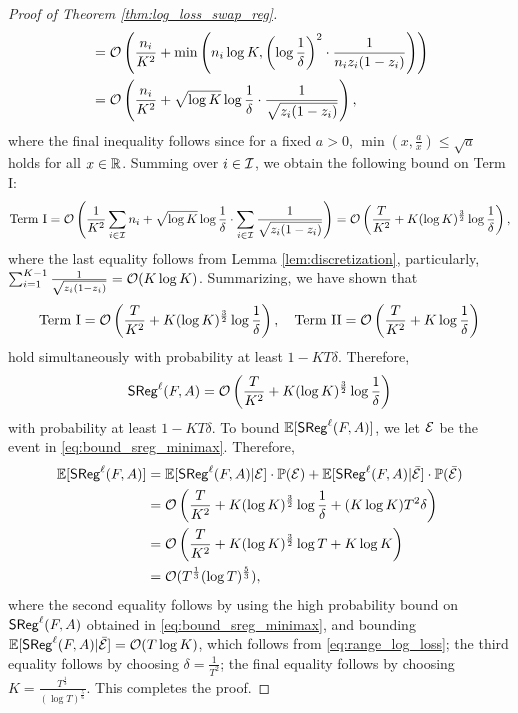 \begin{proof}[Proof of Theorem \ref{thm:log_loss_swap_reg}]
\begin{align*}
        &= \mathcal{O}\left( \frac{n_{i}}{K ^ {2}} + \min\left( n_{i} \log K, \left( \log \frac{1}{\delta} \right) ^ {2} \cdot \frac{1}{n_{i} z_{i}(1 - z_{i})} \right) \right) \\
        &= \mathcal{O}\left( \frac{n_{i}}{K ^ {2}} + \sqrt{\log K}\log \frac{1}{\delta} \cdot \frac{1}{\sqrt{z_{i} (1 - z_{i})}} \right),
    \end{align*}
    where the final inequality follows since for a fixed $a > 0$, $\min(x, \frac{a}{x}) \le \sqrt{a}$ holds for all $x \in {\mathbb{R}}$. Summing over $i \in \mathcal{I}$, we obtain the following bound on Term I: \begin{align*}
        \text{Term I} = \mathcal{O}\left( \frac{1}{K ^ {2}} \sum_{i \in \mathcal{I}} n_{i} + \sqrt{\log K}\log \frac{1}{\delta} \cdot \sum_{i \in \mathcal{I}} \frac{1}{\sqrt{z_{i} (1 - z_{i})}} \right) = \mathcal{O}\left( \frac{T}{K ^ {2}} + K (\log K)^{\frac{3}{2}}  \log \frac{1}{\delta} \right),
    \end{align*}
    where the last equality follows from Lemma \ref{lem:discretization}, particularly, $\sum_{i = 1} ^ {K - 1} \frac{1}{\sqrt{z_{i}(1 - z_{i})}} = \mathcal{O}(K \log K)$. Summarizing, we have shown that \begin{align*}
        \text{Term I} = \mathcal{O}\left( \frac{T}{K ^ {2}} + K (\log K)^{\frac{3}{2}}  \log \frac{1}{\delta} \right), \quad \text{Term II} = \mathcal{O}\left( \frac{T}{K ^ {2}} + K \log \frac{1}{\delta} \right)
    \end{align*}
    hold simultaneously with probability at least $1 - KT \delta$. Therefore, \begin{align}\label{eq:bound_sreg_minimax}
        \mathsf{SReg}^{\ell}(F, A) = \mathcal{O}\left( \frac{T}{K ^ {2}} + K (\log K) ^ {\frac{3}{2}} \log \frac{1}{\delta} \right)
    \end{align}
    with probability at least $1 - KT \delta$. To bound $\mathbb{E}[\mathsf{SReg}^{\ell}(F, A)]$, we let $\mathcal{E}$ be the event in \eqref{eq:bound_sreg_minimax}.
    Therefore, \begin{align*}
        \mathbb{E}[\mathsf{SReg}^{\ell}(F, A)] &=  \mathbb{E}[\mathsf{SReg}^{\ell}(F, A) | \mathcal{E}] \cdot \mathbb{P}(\mathcal{E}) + \mathbb{E}[\mathsf{SReg}^{\ell}(F, A) | \bar{\mathcal{E}}] \cdot \mathbb{P}(\bar{\mathcal{E}}) \\
        &= \mathcal{O}\left( \frac{T}{K ^ {2}} + K (\log K)^{\frac{3}{2}} \log \frac{1}{\delta} + (K\log K) T^{2} \delta \right) \\
        &= \mathcal{O}\left( \frac{T}{K ^ {2}} + K(\log K) ^ {\frac{3}{2}} \log T + K \log K \right) \\
        &= \mathcal{O}(T^{\frac{1}{3}} (\log T) ^ {\frac{5}{3}}),
    \end{align*}
    where the second equality follows by using the high probability bound on $\mathsf{SReg}^{\ell}(F, A)$ obtained in \eqref{eq:bound_sreg_minimax}, and bounding $\mathbb{E}[\mathsf{SReg}^{\ell}(F, A) | \bar{\mathcal{E}}] = \mathcal{O}(T \log K)$, which follows from \eqref{eq:range_log_loss}; the third equality follows by choosing $\delta = \frac{1}{T^{2}}$;
    the final equality follows by choosing $K = \frac{T^{\frac{1}{3}}}{(\log T)^{\frac{5}{6}}}$. This completes the proof.
\end{proof}


